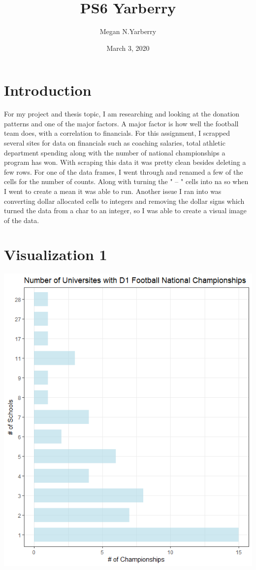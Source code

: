 \documentclass{article}
\title{PS6 Yarberry}
\author{Megan N.Yarberry }
\date{March 3, 2020}
\begin{document}
\maketitle

\section{Introduction}

For my project and thesis topic, I am researching and looking at the donation patterns and one of the major factors. A major factor is how well the football team does, with a correlation to financials. For this assignment, I scrapped several sites for data on financials such as coaching salaries, total athletic department spending along with the number of national championships a program has won. With scraping this data it was pretty clean besides deleting a few rows. For one of the data frames, I went through and renamed a few of the cells for the number of counts. Along with turning the " -- " cells into na so when I went to create a mean it was able to run. Another issue I ran into was converting dollar allocated cells to integers and removing the dollar signs which turned the data from a char to an integer, so I was able to create a visual image of the data.  
\section{Visualization 1}
\includegraphics[scale=.75]{PS6a_Yarberry.png}
\end{document}
